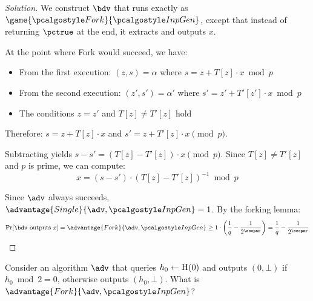 \begin{proof}[Solution]
  We construct $\bdv$ that runs exactly as $\game{\algo{Fork}}{\algo{InpGen}}$, except that instead of returning $\pctrue$ at the end, it extracts and outputs $x$.
  
  At the point where Fork would succeed, we have:
  \begin{itemize}
    \item From the first execution: $(z, s) = \alpha$ where $s = z + T[z] \cdot x \bmod p$
    \item From the second execution: $(z', s') = \alpha'$ where $s' = z' + T'[z'] \cdot x \bmod p$
    \item The conditions $z = z'$ and $T[z] \neq T'[z]$ hold
  \end{itemize}
  
  Therefore: $s = z + T[z] \cdot x$ and $s' = z + T'[z] \cdot x \pmod{p}$.
  
  Subtracting yields $s - s' = (T[z] - T'[z]) \cdot x \pmod{p}$. Since $T[z] \neq T'[z]$ and $p$ is prime, we can compute:
  \[
  x = (s - s') \cdot (T[z] - T'[z])^{-1} \bmod p
  \]
  
  Since $\adv$ always succeeds, $\advantage{Single}{\adv, \algo{InpGen}} = 1$. By the forking lemma:
  \[
  \Pr[\bdv \text{ outputs } x] = \advantage{Fork}{\adv, \algo{InpGen}} \geq 1 \cdot \left(\frac{1}{q} - \frac{1}{2^\secpar}\right) = \frac{1}{q} - \frac{1}{2^\secpar}
  \]
\end{proof}

\begin{exercise}
  Consider an algorithm $\adv$ that queries $h_0 \gets {\normalfont\textsc{H}}(0)$ and outputs $(0, \bot)$ if $h_0 \bmod 2 = 0$, otherwise outputs $(h_0, \bot)$. What is $\advantage{Fork}{\adv, \algo{InpGen}}$?
\end{exercise}

